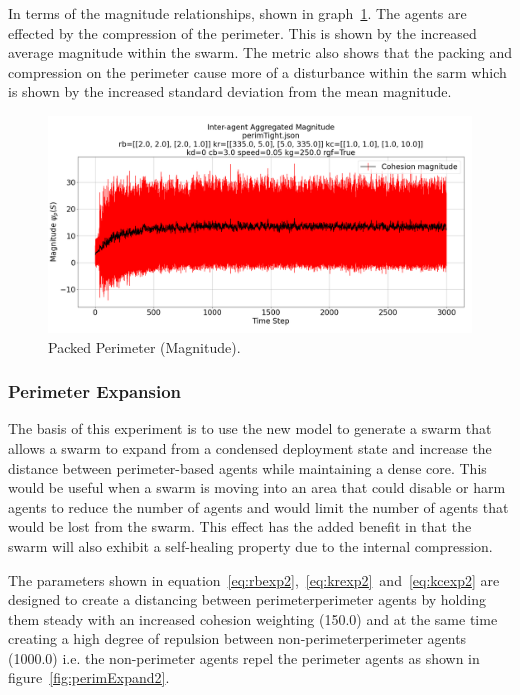 \documentclass[12pt,a4paper]{IEEEtran}
\begin{document}
In terms of the magnitude relationships, shown in graph~\ref{fig:tightPerimMagnitude}. The agents are effected by the compression of the perimeter. This is shown by the increased average magnitude within the swarm. The metric also shows that the packing and compression on the perimeter cause more of a disturbance within the sarm which is shown by the increased standard deviation from the mean magnitude.

\begin{figure}[H]
	\begin{center}
		\includegraphics[width=1.0\linewidth]{figures/tightPerimMagnitude}
	\end{center}
	\caption{Packed Perimeter (Magnitude). \label{fig:tightPerimMagnitude}}
\end{figure}

\subsubsection{Perimeter Expansion}
The basis of this experiment is to use the new model to generate a swarm that allows a swarm to expand from a condensed deployment state and increase the distance between perimeter-based agents while maintaining a dense core. This would be useful when a swarm is moving into an area that could disable or harm agents to reduce the number of agents and would limit the number of agents that would be lost from the swarm. This effect has the added benefit in that the swarm will also exhibit a self-healing property due to the internal compression.

The parameters shown in equation~\ref{eq:rbexp2},~\ref{eq:krexp2}~and~\ref{eq:kcexp2} are designed to create a distancing between perimeter\textrightarrow perimeter agents by holding them steady with an increased cohesion weighting (150.0) and at the same time creating a high degree of repulsion between non-perimeter\textrightarrow perimeter agents (1000.0) i.e. the non-perimeter agents repel the perimeter agents as shown in figure~\ref{fig:perimExpand2}.
\end{document}
